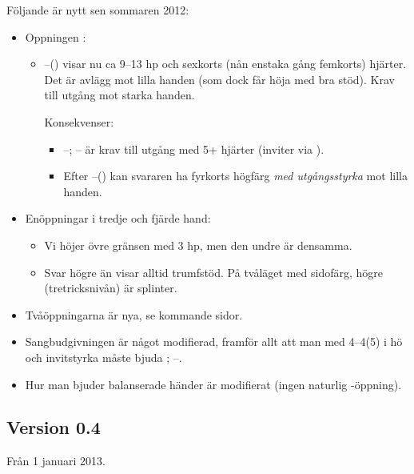 Följande är nytt sen sommaren 2012:

\begin{itemize}
\item Oppningen :
\begin{itemize}
   \item {}--() visar nu ca 9--13 hp och
     sexkorts (nån enstaka gång femkorts)  hjärter. Det är avlägg mot lilla handen (som dock
     får höja med bra 
     stöd). Krav till utgång mot starka handen.

     Konsekvenser:
\begin{itemize}
\item {}--; -- är krav till utgång med 5+ hjärter
  (inviter via ).
\item Efter --() kan svararen ha fyrkorts högfärg
  \emph{med ut\-gångs\-styrka} mot lilla handen.
\end{itemize}
\end{itemize}
\item Enöppningar i tredje och fjärde hand:
\begin{itemize}
\item Vi höjer övre gränsen med 3
  hp, men den undre är densamma.
\item Svar högre än  visar alltid trumfstöd. På tvåläget med
  sidofärg, högre (tretricksnivån) är splinter.
\end{itemize}
\item Tvåöppningarna är nya, se kommande sidor.
\item Sangbudgivningen är något modifierad, framför allt att man med 4--4(5) i
  hö och invitstyrka måste bjuda ; --.
\item Hur man bjuder balanserade händer är modifierat (ingen naturlig
  -öppning). 
\end{itemize}

\subsection*{Version 0.4}

Från 1 januari 2013.

